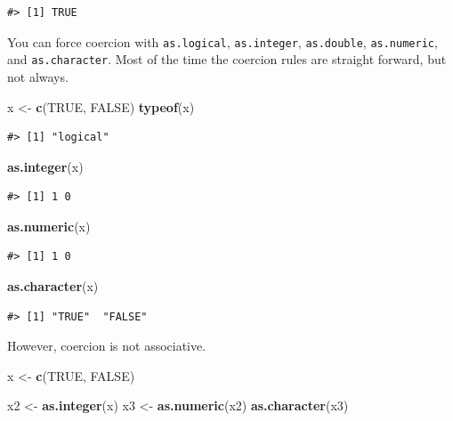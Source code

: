 \documentclass[]{book}
\newenvironment{Shaded}{\begin{snugshade}}{\end{snugshade}}
\newcommand{\KeywordTok}[1]{\textcolor[rgb]{0.13,0.29,0.53}{\textbf{#1}}}
\newcommand{\StringTok}[1]{\textcolor[rgb]{0.31,0.60,0.02}{#1}}
\newcommand{\OtherTok}[1]{\textcolor[rgb]{0.56,0.35,0.01}{#1}}
\newcommand{\NormalTok}[1]{#1}
\theoremstyle{definition}
\theoremstyle{definition}
\theoremstyle{definition}
\theoremstyle{remark}
\begin{document}
\begin{verbatim}
#> [1] TRUE
\end{verbatim}

You can force coercion with \texttt{as.logical}, \texttt{as.integer},
\texttt{as.double}, \texttt{as.numeric}, and \texttt{as.character}. Most
of the time the coercion rules are straight forward, but not always.

\begin{Shaded}
\begin{Highlighting}[]
\NormalTok{x <-}\StringTok{ }\KeywordTok{c}\NormalTok{(}\OtherTok{TRUE}\NormalTok{, }\OtherTok{FALSE}\NormalTok{)}
\KeywordTok{typeof}\NormalTok{(x)}
\end{Highlighting}
\end{Shaded}

\begin{verbatim}
#> [1] "logical"
\end{verbatim}

\begin{Shaded}
\begin{Highlighting}[]
\KeywordTok{as.integer}\NormalTok{(x)}
\end{Highlighting}
\end{Shaded}

\begin{verbatim}
#> [1] 1 0
\end{verbatim}

\begin{Shaded}
\begin{Highlighting}[]
\KeywordTok{as.numeric}\NormalTok{(x)}
\end{Highlighting}
\end{Shaded}

\begin{verbatim}
#> [1] 1 0
\end{verbatim}

\begin{Shaded}
\begin{Highlighting}[]
\KeywordTok{as.character}\NormalTok{(x)}
\end{Highlighting}
\end{Shaded}

\begin{verbatim}
#> [1] "TRUE"  "FALSE"
\end{verbatim}

However, coercion is not associative.

\begin{Shaded}
\begin{Highlighting}[]
\NormalTok{x <-}\StringTok{ }\KeywordTok{c}\NormalTok{(}\OtherTok{TRUE}\NormalTok{, }\OtherTok{FALSE}\NormalTok{)}

\NormalTok{x2 <-}\StringTok{ }\KeywordTok{as.integer}\NormalTok{(x)}
\NormalTok{x3 <-}\StringTok{ }\KeywordTok{as.numeric}\NormalTok{(x2)}
\KeywordTok{as.character}\NormalTok{(x3)}
\end{Highlighting}
\end{Shaded}
\end{document}
